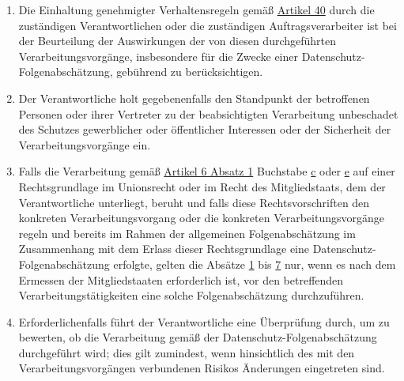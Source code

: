 \begin{enumerate}
\begin{enumerate}
  \end{enumerate}

  \item Die Einhaltung genehmigter Verhaltensregeln gemäß \hyperref[ch:40]{Artikel 40} durch die zuständigen
   Verantwortlichen oder die zuständigen Auftragsverarbeiter ist bei der Beurteilung der Auswirkungen der von diesen
   durchgeführten Verarbeitungsvorgänge, insbesondere für die Zwecke einer Datenschutz-Folgenabschätzung, gebührend zu
   berücksichtigen.
  \label{itm:35-8}

  \item Der Verantwortliche holt gegebenenfalls den Standpunkt der betroffenen Personen oder ihrer Vertreter zu der
   beabsichtigten Verarbeitung unbeschadet des Schutzes gewerblicher oder öffentlicher Interessen oder der Sicherheit
   der Verarbeitungsvorgänge ein.
  \label{itm:35-9}

  \item Falls die Verarbeitung gemäß \hyperref[itm:06-1]{Artikel 6 Absatz 1} Buchstabe \hyperref[itm:06-1c]
   {c} oder \hyperref[itm:06-1e]{e} auf einer Rechtsgrundlage im Unionsrecht oder im Recht des Mitgliedstaats, dem der
   Verantwortliche unterliegt, beruht und falls diese Rechtsvorschriften den konkreten Verarbeitungsvorgang oder die
   konkreten Verarbeitungsvorgänge regeln und bereits im Rahmen der allgemeinen Folgenabschätzung im Zusammenhang mit
   dem Erlass dieser Rechtsgrundlage eine Datenschutz-Folgenabschätzung erfolgte, gelten die Absätze \hyperref
   [itm:35-1]{1} bis \hyperref[itm:35-7]{7} nur, wenn es nach dem Ermessen der Mitgliedstaaten erforderlich ist, vor
   den betreffenden Verarbeitungstätigkeiten eine solche Folgenabschätzung durchzuführen.
  \label{itm:35-10}

  \item Erforderlichenfalls führt der Verantwortliche eine Überprüfung durch, um zu bewerten, ob die Verarbeitung gemäß
   der Datenschutz-Folgenabschätzung durchgeführt wird; dies gilt zumindest, wenn hinsichtlich des mit den
   Verarbeitungsvorgängen verbundenen Risikos Änderungen eingetreten sind.
  \label{itm:35-11}

\end{enumerate}


